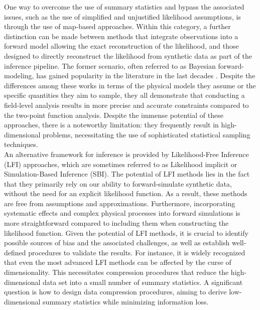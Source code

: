 \documentclass{aa}
\begin{document}
One way to overcome the use of summary statistics and bypass the associated issues, such as the use of simplified and unjustified likelihood assumptions, is through the use of map-based approaches.
Within this category, a further distinction can be made between methods that integrate observations into a forward model allowing the exact reconstruction of the likelihood, and those designed to directly reconstruct the likelihood from synthetic data as part of the inference pipeline.
The former scenario, often referred to as Bayesian forward-modeling,  has gained popularity in the literature in the last decades \citep{schneider2015hierarchical, alsing2016hierarchical, alsing2017cosmological, bohm2017bayesian, porqueres2021bayesian, porqueres2022lifting, porqueres2023field}. Despite the differences among these works in terms of the physical models they assume or the specific quantities they aim to sample, they all demonstrate that conducting a field-level analysis results in more precise and accurate constraints compared to the two-point function analysis.
Despite the immense potential of these approaches, there is a noteworthy limitation: they frequently result in high-dimensional problems, necessitating the use of sophisticated statistical sampling techniques. \\
An alternative framework for inference is provided by Likelihood-Free Inference (LFI) approaches, which are sometimes referred to as Likelihood implicit or Simulation-Based Inference (SBI). 
The potential of LFI methods lies in the fact that they primarily rely on our ability to forward-simulate synthetic data, without the need for an explicit likelihood function. As a result, these methods are free from assumptions and approximations. Furthermore, incorporating systematic effects and complex physical processes into forward simulations is more straightforward compared to including them when constructing the likelihood function.
Given the potential of LFI methods, it is crucial to identify possible sources of bias and the associated challenges, as well as establish well-defined procedures to validate the results. For instance, it is widely recognized that even the most advanced LFI methods can be affected by the curse of dimensionality. This necessitates compression procedures that reduce the high-dimensional data set into a small number of summary statistics.
A significant question is how to design data compression procedures, aiming to derive low-dimensional summary statistics while minimizing information loss.
\end{document}
